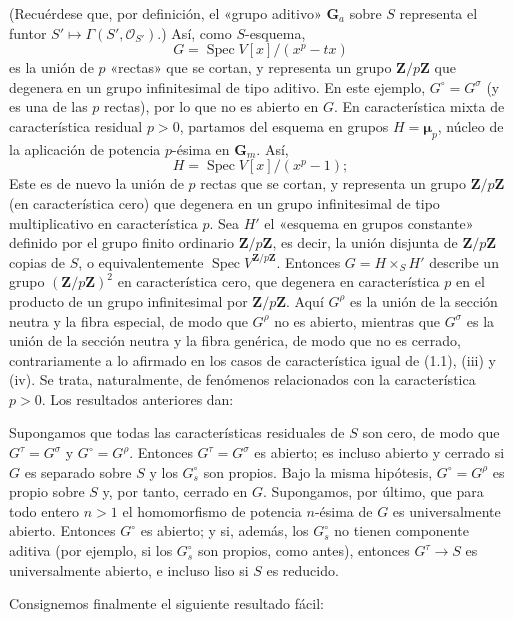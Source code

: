 (Recuérdese que, por definición, el «grupo aditivo» $\mathbf G_a$ sobre $S$
representa el funtor $S'\longmapsto\Gamma(S',\mathcal O_{S'})$.) Así, como
$S$-esquema,
\[
G=\operatorname{Spec}V[x]/(x^p-tx)
\]
es la unión de $p$ «rectas» que se cortan, y representa un grupo
$\mathbf Z/p\mathbf Z$ que degenera en un grupo infinitesimal de tipo aditivo.
En este ejemplo, $G^\circ=G^\sigma$ (y es una de las $p$ rectas), por lo que no
es abierto en $G$. En característica mixta de característica residual $p>0$,
partamos del esquema en grupos $H=\boldsymbol\mu_p$, núcleo de la aplicación de
potencia $p$-ésima en $\mathbf G_m$. Así,
\[
H=\operatorname{Spec}V[x]/(x^p-1);
\]
Este es de nuevo la unión de $p$ rectas que se cortan, y representa un grupo
$\mathbf Z/p\mathbf Z$ (en característica cero) que degenera en un grupo
infinitesimal de tipo multiplicativo en característica $p$. Sea $H'$ el
«esquema en grupos constante» definido por el grupo finito ordinario
$\mathbf Z/p\mathbf Z$, es decir, la unión disjunta de $\mathbf Z/p\mathbf Z$
copias de $S$, o equivalentemente
$\operatorname{Spec}V^{\mathbf Z/p\mathbf Z}$. Entonces $G=H\times_S H'$
describe un grupo $(\mathbf Z/p\mathbf Z)^2$ en característica cero, que
degenera en característica $p$ en el producto de un grupo infinitesimal por
$\mathbf Z/p\mathbf Z$. Aquí $G^\rho$ es la unión de la sección neutra y la
fibra especial, de modo que $G^\rho$ no es abierto, mientras que $G^\sigma$ es
la unión de la sección neutra y la fibra genérica, de modo que no es cerrado,
contrariamente a lo afirmado en los casos de característica igual de (1.1),
(iii) y (iv). Se trata, naturalmente, de fenómenos relacionados con la
característica $p>0$. Los resultados anteriores dan:

 Supongamos que todas las características residuales de
$S$ son cero, de modo que $G^\tau=G^\sigma$ y $G^\circ=G^\rho$. Entonces
$G^\tau=G^\sigma$ es abierto; es incluso abierto y cerrado si $G$ es separado
sobre $S$ y los $G_s^\circ$ son propios. Bajo la misma hipótesis,
$G^\circ=G^\rho$ es propio sobre $S$ y, por tanto, cerrado en $G$. Supongamos,
por último, que para todo entero $n>1$ el homomorfismo de potencia $n$-ésima de
$G$ es universalmente abierto. Entonces $G^\circ$ es abierto; y si, además,
los $G_s^\circ$ no tienen componente aditiva (por ejemplo, si los
$G_s^\circ$ son propios, como antes), entonces $G^\tau\longrightarrow S$ es
universalmente abierto, e incluso liso si $S$ es reducido.

Consignemos finalmente el siguiente resultado fácil:

